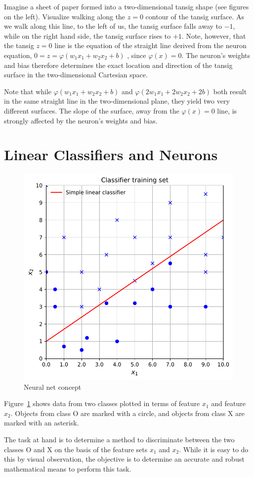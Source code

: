 Imagine a sheet of paper formed into a two-dimensional tansig shape (see figures on the left).  Visualize walking along the $z=0$ contour of the tansig surface.  As we walk along this line, to the left of us, the tansig surface falls away to $-1$, while on the right hand side, the tansig surface rises to $+1$.  Note, however, that the tansig $z=0$ line is the equation of the straight line derived from the neuron equation, $0=z=\varphi(w_1x_1+w_2x_2+b)$ , since $\varphi(x)=0$.  The neuron's weights and bias therefore determines the exact location and direction of the tansig surface in the two-dimensional Cartesian space.  

Note that while $\varphi(w_1x_1+w_2x_2+b)$  and  $\varphi(2w_1x_1+2w_2x_2+2b)$ both result in the same straight line in the two-dimensional plane, they yield two very different surfaces.  The slope of the surface, away from the  $\varphi(x)=0$ line, is strongly affected by the neuron's weights and bias.  

\section{Linear Classifiers and Neurons}

\begin{figure}[tb]
\centering
\includegraphics[width=.6\textwidth]{pic/chC-trainingset}
\caption{Neural net concept\label{fig:chC-trainingset}}
\end{figure}

Figure~\ref{fig:chC-trainingset} shows data from two classes plotted in terms of feature $x_1$ and feature $x_2$.  Objects from class O are marked with a circle, and objects from class X are marked with an asterisk.  

The task at hand is to determine a method to discriminate between the two classes O and X on the basis of the feature sets $x_1$ and $x_2$.  While it is easy to do this by visual observation, the objective is to determine an accurate and robust mathematical means to perform this task.  

